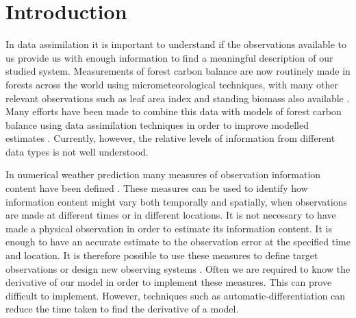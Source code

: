 
\section{Introduction}
In data assimilation it is important to understand if the observations available to us provide us with enough information to find a meaningful description of our studied system. Measurements of forest carbon balance are now routinely made in forests across the world using micrometeorological techniques, with many other relevant observations such as leaf area index and standing biomass also available \citep{baldocchi2008turner}. Many efforts have been made to combine this data with models of forest carbon balance using data assimilation techniques in order to improve modelled estimates \citep{zobitz2011primer, fox2009reflex, richardson2010estimating, Quaife2008, Zobitz2014, Niu2014}. Currently, however, the relative levels of information from different data types is not well understood. 

In numerical weather prediction many measures of observation information content have been defined \citep{Cardinali2004, rodgers2000inverse, fisher2003estimation}. These measures can be used to identify how information content might vary both temporally and spatially, when observations are made at different times or in different locations. It is not necessary to have made a physical observation in order to estimate its information content. It is enough to have an accurate estimate to the observation error at the specified time and location. It is therefore possible to use these measures to define target observations or design new observing systems \citep{palmer1998singular, eyre1990information}. Often we are required to know the derivative of our model in order to implement these measures. This can prove difficult to implement. However, techniques such as automatic-differentiation \citep{renaud1997automatic} can reduce the time taken to find the derivative of a model.  

